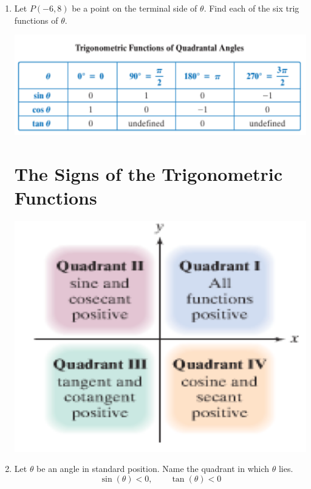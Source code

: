 \documentclass[11pt]{article}
\begin{document}
\begin{enumerate}
\item Let $P(-6,8)$ be a point on the terminal side of $\theta$.  Find each of the six trig functions of $\theta$.\\[2in]

\begin{center}
\includegraphics[scale=.7]{quadrantal}
\end{center}

\section{The Signs of the Trigonometric Functions}
\begin{center}
\includegraphics[scale=.8]{signs}
\end{center}

\item Let $\theta$ be an angle in standard position.  Name the quadrant in which $\theta$ lies.
$$\sin(\theta)<0, \quad \quad \tan(\theta)<0$$


\newpage


\end{enumerate}
\end{document}
